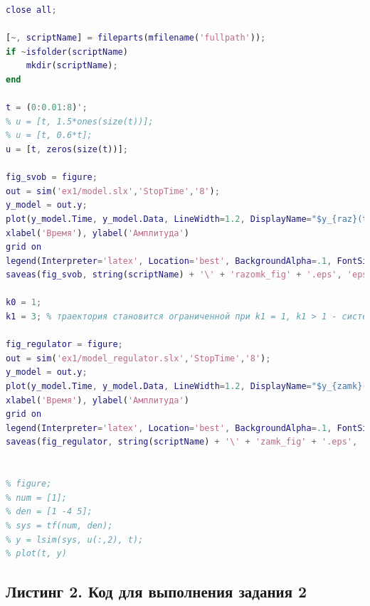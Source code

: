 \documentclass[a4paper]{article}
\begin{document}
\begin{lstlisting}[caption={Код для построения графиков для задания 1}, language=matlab]
% clear all;
close all;

[~, scriptName] = fileparts(mfilename('fullpath'));
if ~isfolder(scriptName)
    mkdir(scriptName);
end

t = (0:0.01:8)';
% u = [t, 1.5*ones(size(t))];
% u = [t, 0.6*t];
u = [t, zeros(size(t))];

fig_svob = figure;
out = sim('ex1/model.slx','StopTime','8');
y_model = out.y;
plot(y_model.Time, y_model.Data, LineWidth=1.2, DisplayName="$y_{raz}(t)$")
xlabel('Время'), ylabel('Амплитуда')
grid on
legend(Interpreter='latex', Location='best', BackgroundAlpha=.1, FontSize=12, FontName='Computer Modern')
saveas(fig_svob, string(scriptName) + '\' + 'razomk_fig' + '.eps', 'epsc')

k0 = 1;
k1 = 3; % траектория становится ограниченной при k1 = 1, k1 > 1 - система Ау, k1 < 1 - Ну

fig_regulator = figure;
out = sim('ex1/model_regulator.slx','StopTime','8');
y_model = out.y;
plot(y_model.Time, y_model.Data, LineWidth=1.2, DisplayName="$y_{zamk}(t)$")
xlabel('Время'), ylabel('Амплитуда')
grid on
legend(Interpreter='latex', Location='best', BackgroundAlpha=.1, FontSize=12, FontName='Computer Modern')
saveas(fig_regulator, string(scriptName) + '\' + 'zamk_fig' + '.eps', 'epsc')


% figure;
% num = [1];
% den = [1 -4 5];
% sys = tf(num, den);
% y = lsim(sys, u(:,2), t);
% plot(t, y)
\end{lstlisting}
\subsection*{Листинг 2. Код для выполнения задания 2}
\end{document}
